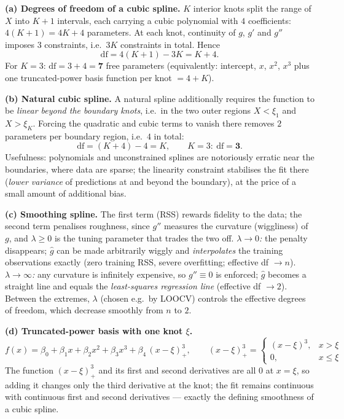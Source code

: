 \documentclass[11pt,a4paper]{article}
\begin{document}
\ifdefined\withsolutions
\begin{solutionbox}
\textbf{(a) Degrees of freedom of a cubic spline.}
$K$ interior knots split the range of $X$ into $K+1$ intervals, each carrying a cubic
polynomial with $4$ coefficients: $4(K+1)=4K+4$ parameters. At each knot, continuity of
$g$, $g'$ and $g''$ imposes $3$ constraints, i.e.\ $3K$ constraints in total. Hence
\[
  \mathrm{df}=4(K+1)-3K=K+4 .
\]
For $K=3$: $\mathrm{df}=3+4=\mathbf{7}$ free parameters (equivalently: intercept, $x$, $x^2$,
$x^3$ plus one truncated-power basis function per knot $=4+K$).

\medskip
\textbf{(b) Natural cubic spline.}
A natural spline additionally requires the function to be \emph{linear beyond the boundary
knots}, i.e.\ in the two outer regions $X<\xi_1$ and $X>\xi_K$. Forcing the quadratic and cubic
terms to vanish there removes $2$ parameters per boundary region, i.e.\ $4$ in total:
\[
  \mathrm{df}=(K+4)-4=K,\qquad K=3:\ \mathrm{df}=\mathbf{3}.
\]
Usefulness: polynomials and unconstrained splines are notoriously erratic near the boundaries,
where data are sparse; the linearity constraint stabilises the fit there
(\emph{lower variance} of predictions at and beyond the boundary), at the price of a small
amount of additional bias.

\medskip
\textbf{(c) Smoothing spline.}
The first term (RSS) rewards fidelity to the data; the second term penalises roughness, since
$g''$ measures the curvature (wiggliness) of $g$, and $\lambda\ge 0$ is the tuning parameter
that trades the two off.
\emph{$\lambda\to 0$:} the penalty disappears; $\hat{g}$ can be made arbitrarily wiggly and
\emph{interpolates} the training observations exactly (zero training RSS, severe overfitting;
effective df $\to n$).
\emph{$\lambda\to\infty$:} any curvature is infinitely expensive, so $g''\equiv 0$ is enforced;
$\hat{g}$ becomes a straight line and equals the \emph{least-squares regression line}
(effective df $\to 2$). Between the extremes, $\lambda$ (chosen e.g.\ by LOOCV) controls the
effective degrees of freedom, which decrease smoothly from $n$ to $2$.

\medskip
\textbf{(d) Truncated-power basis with one knot $\xi$.}
\[
  f(x)=\beta_0+\beta_1x+\beta_2x^2+\beta_3x^3+\beta_4\,(x-\xi)^3_+,
  \qquad
  (x-\xi)^3_+=\begin{cases}(x-\xi)^3, & x>\xi\\[0.5mm] 0, & x\le\xi\end{cases}
\]
The function $(x-\xi)^3_+$ and its first and second derivatives are all $0$ at $x=\xi$, so
adding it changes only the third derivative at the knot; the fit remains continuous with
continuous first and second derivatives --- exactly the defining smoothness of a cubic spline.
\end{solutionbox}
\fi
\end{document}
